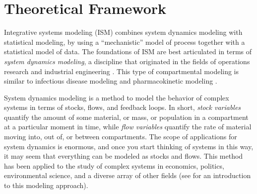 \chapter{Theoretical Framework}
\label{theory-system_dynamics}

Integrative systems modeling (ISM) combines system dynamics modeling
with statistical modeling, by using a ``mechanistic'' model of process
together with a statistical model of data.  The foundations of ISM are
best articulated in terms of \emph{system dynamics modeling}, a
discipline that originated in the fields of operations research and
industrial engineering \cite{Forrester 1961. Industrial
  dynamics. Waltham, MA: Pegasus Communications} \cite{Forrester
  1969. Urban Dynamics. Pegasus Communications} \cite{Forrester
  1971. World Dynamics. Wright-Allen Press} \cite{Forrester
  1971. World Dynamics. Wright-Allen Press}
\cite{Meadows_Thinking_2008}.  This type of compartmental modeling is
similar to infectious disease modeling \cite{andersen and may -
  infectiuos disease in humans} \cite{keeling and rohani - Modeling
  Infectious Diseases in Humans and Animals} \cite{An Introduction to
  Infectious Disease Modelling - Vynnycky and White}
\cite{Mathematical Epidemiology of Infectious Diseases: Model
  Building, Analysis and Interpretation Diekmann Heesterbeek} and
pharmacokinetic modeling \cite{Compartmental Analysis in Biology and
  Medicine 3rd Edition - John A. Jacquez}
\cite{Jacquez_Modeling_1999}.

System dynamics modeling is a method to model the behavior of complex
systems in terms of stocks, flows, and feedback loops.  In short,
\emph{stock variables} quantify the amount of some material, or mass,
or population in a compartment at a particular moment in time, while
\emph{flow variables} quantify the rate of material moving into, out
of, or between compartments. The scope of applications for system
dynamics is enormous, and once you start thinking of systems in this
way, it may seem that everything can be modeled as stocks and
flows. This method has been applied to the study of complex systems in
economics, politics, environmental science, and a diverse array of
other fields (see
\cite{Meadows_Thinking_2008,Jacquez_Modeling_1999,Harte_Consider_1988}
for an introduction to this modeling approach).

